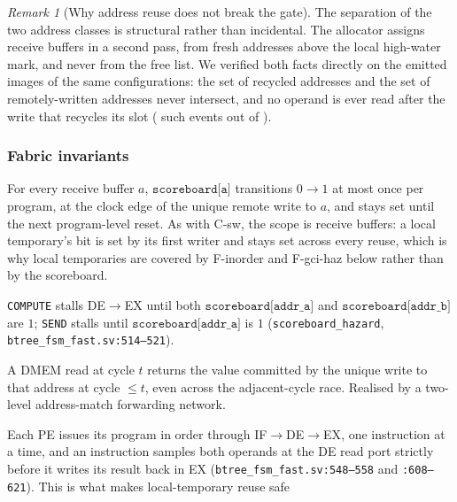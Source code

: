 \documentclass[journal,10pt]{IEEEtran}
\theoremstyle{plain}
\theoremstyle{definition}
\theoremstyle{remark}
\newtheorem*{remark}{Remark}
\newcommand{\sv}[1]{\texttt{#1}}
\begin{document}
\begin{remark}[Why address reuse does not break the gate]
The separation of the two address classes is structural rather than
incidental. The allocator assigns receive buffers in a second pass, from
fresh addresses above the local high-water mark, and never from the free
list. We verified both facts directly on the emitted images of the same
\RecycleConfigs{} configurations: the set of recycled addresses and the set
of remotely-written addresses never intersect, and no operand is ever read
after the write that recycles its slot (\RecycleUnsafe{} such events out of
\RecycleEvents{}).
\end{remark}

\subsubsection*{Fabric invariants}
\begin{description}[leftmargin=2.2em,style=nextline]
\item[\textsf{F-sb-mono} (Scoreboard monotonicity).] For every receive
  buffer $a$, $\texttt{scoreboard[a]}$ transitions $0 \to 1$ at most once
  per program, at the clock edge of the unique remote write to $a$, and
  stays set until the next program-level reset. As with \textsf{C-sw}, the
  scope is receive buffers: a local temporary's bit is set by its first
  writer and stays set across every reuse, which is why local temporaries
  are covered by \textsf{F-inorder} and \textsf{F-gci-haz} below rather
  than by the scoreboard.
\item[\textsf{F-sb-gate} (Scoreboard gating).] \texttt{COMPUTE} stalls
  \textsf{DE}$\to$\textsf{EX} until both $\texttt{scoreboard[addr\_a]}$
  and $\texttt{scoreboard[addr\_b]}$ are $1$; \texttt{SEND} stalls until
  $\texttt{scoreboard[addr\_a]}$ is $1$
  (\sv{scoreboard\_hazard}, \sv{btree\_fsm\_fast.sv:514--521}).
\item[\textsf{F-fw} (DMEM write-to-read forwarding).] A DMEM read at cycle
  $t$ returns the value committed by the unique write to that address at
  cycle $\leq t$, even across the adjacent-cycle race. Realised by a
  two-level address-match forwarding network.
\item[\textsf{F-inorder} (In-order single-PE issue).] Each PE issues its
  program in order through \textsf{IF}$\to$\textsf{DE}$\to$\textsf{EX},
  one instruction at a time, and an instruction samples both operands at
  the \textsf{DE} read port strictly before it writes its result back in
  \textsf{EX} (\sv{btree\_fsm\_fast.sv:548--558} and \sv{:608--621}).
  This is what makes local-temporary reuse safe

\end{description}
\end{document}
